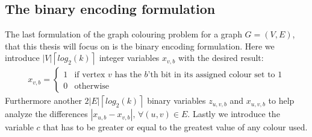 \subsection{The binary encoding formulation}
The last formulation of the graph colouring problem for a graph $G=(V,E)$, that this thesis will focus on is the binary encoding formulation. Here we introduce $|V|\left \lceil{log_2(k)}\right \rceil $ integer variables $x_{v,b}$ with the desired result:
\begin{align}\label{binX}
x_{v,b} =\left\{
\begin{array}{ll}
1 & \text{if vertex }v \text{ has the $b$'th bit in its assigned colour set to 1} \\ 0 & \text{otherwise}
\end{array}\right.
\end{align} 
Furthermore another $2|E|\left \lceil{log_2(k)}\right \rceil$ binary variables $z_{u,v,b}$ and $x_{u,v,b}$ to help analyze the differences $|x_{u,b}-x_{v,b}|, \, \forall (u,v) \in E$.
Lastly we introduce the variable $c$ that has to be greater or equal to the greatest value of any colour used.
